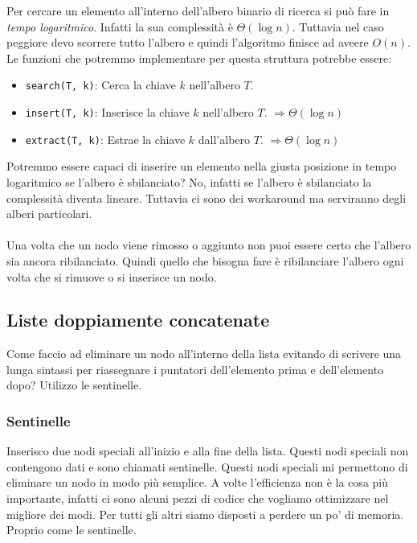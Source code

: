 \documentclass[a4paper]{article}
\begin{document}
\noindent
Per cercare un elemento all'interno dell'albero binario di ricerca si può fare in \textit{tempo logaritmico}.
Infatti la sua complessità è $\Theta(\log n)$. Tuttavia nel caso peggiore devo scorrere tutto l'albero e quindi
l'algoritmo finisce ad aveere $O(n)$. Le funzioni che potremmo implementare per questa struttura potrebbe essere:
\begin{itemize}
  \item \texttt{search(T, k)}: Cerca la chiave \( k \) nell'albero \( T \).
  \item \texttt{insert(T, k)}: Inserisce la chiave \( k \) nell'albero \( T \). $\Longrightarrow \Theta(\log n)$ 
  \item \texttt{extract(T, k)}: Estrae la chiave \( k \) dall'albero \( T \). $\Longrightarrow \Theta(\log n)$ 
\end{itemize}
\noindent
Potremmo essere capaci di inserire un elemento nella giusta posizione in tempo logaritmico se l'albero è sbilanciato?
No, infatti se l'albero è sbilanciato la complessità diventa lineare. Tuttavia ci sono dei workaround ma serviranno degli alberi particolari.
\\\\
Una volta che un nodo viene rimosso o aggiunto non puoi essere certo che l'albero sia ancora ribilanciato. Quindi quello che bisogna fare
è ribilanciare l'albero ogni volta che si rimuove o si inserisce un nodo. 

\subsection{Liste doppiamente concatenate}

Come faccio ad eliminare un nodo all'interno della lista evitando di scrivere una lunga sintassi per riassegnare i puntatori dell'elemento prima e dell'elemento dopo?
Utilizzo le sentinelle.

\subsubsection{Sentinelle}

Inserisco due nodi speciali all'inizio e alla fine della lista. Questi nodi speciali non contengono dati e sono chiamati sentinelle. 
Questi nodi speciali mi permettono di eliminare un nodo in modo più semplice. A volte l'efficienza non è la cosa più importante, infatti ci sono alcuni pezzi di codice
che vogliamo ottimizzare nel migliore dei modi. Per tutti gli altri siamo disposti a perdere un po' di memoria. Proprio come le sentinelle. 
\end{document}

